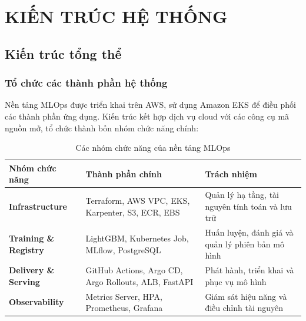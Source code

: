 

\FloatBarrier


\section{KIẾN TRÚC HỆ THỐNG}


\subsection{Kiến trúc tổng thể}


\subsubsection{Tổ chức các thành phần hệ thống}


Nền tảng MLOps được triển khai trên AWS, sử dụng Amazon EKS để điều phối các thành phần ứng dụng. Kiến trúc kết hợp dịch vụ cloud với các công cụ mã nguồn mở, tổ chức thành bốn nhóm chức năng chính:


\begin{table}[!htbp]\centering
\fontsize{12}{15}\selectfont{}
\setlength{\tabcolsep}{4pt}\setlength{\arrayrulewidth}{0.4pt}\renewcommand{\arraystretch}{1.2}
\setlength{\ReportTableWidth}{\dimexpr\linewidth-4\arrayrulewidth\relax}
\begin{tabular}{|L{\tabcolsep\relax}|L{\tabcolsep\relax}|L{\tabcolsep\relax}|}
\hline
\textbf{Nhóm chức năng} & \textbf{Thành phần chính} & \textbf{Trách nhiệm} \\
\hline
\textbf{Infrastructure} & Terraform, AWS VPC, EKS, Karpenter, S3, ECR, EBS & Quản lý hạ tầng, tài nguyên tính toán và lưu trữ \\\hline
\textbf{Training \& Registry} & LightGBM, Kubernetes Job, MLflow, PostgreSQL & Huấn luyện, đánh giá và quản lý phiên bản mô hình \\\hline
\textbf{Delivery \& Serving} & GitHub Actions, Argo CD, Argo Rollouts, ALB, FastAPI & Phát hành, triển khai và phục vụ mô hình \\\hline
\textbf{Observability} & Metrics Server, HPA, Prometheus, Grafana & Giám sát hiệu năng và điều chỉnh tài nguyên \\\hline
\end{tabular}
\caption{Các nhóm chức năng của nền tảng MLOps}\label{tab:06}
\end{table}

